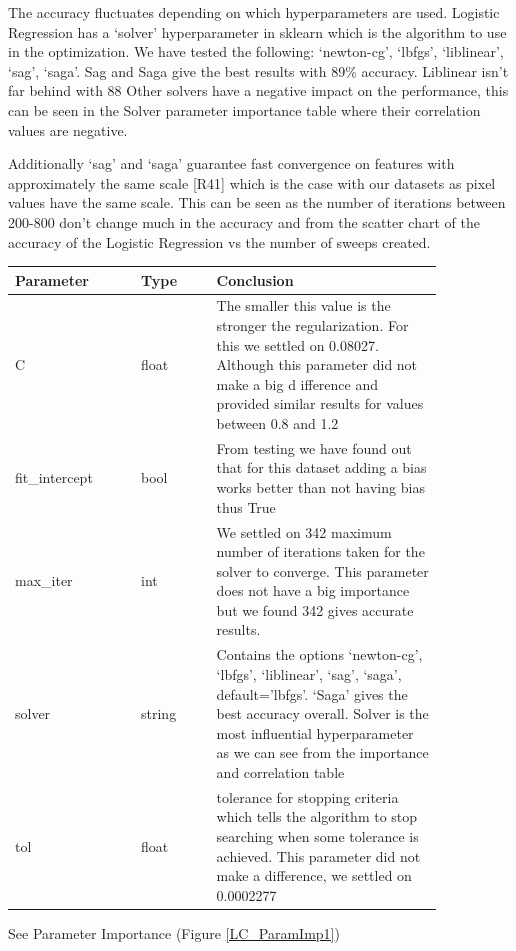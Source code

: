 \documentclass[11pt]{article}
\begin{document}
The accuracy fluctuates depending on which hyperparameters are used. Logistic Regression has a ‘solver’ hyperparameter in sklearn which is the algorithm to use in the optimization. We have tested the following: ‘newton-cg’, ‘lbfgs’, ‘liblinear’, ‘sag’, ‘saga’. Sag and Saga give the best results with 89\% accuracy. Liblinear isn't far behind with 88%
Other solvers have a negative impact on the performance, this can be seen in the Solver parameter importance table where their correlation values are negative.

Additionally ‘sag’ and ‘saga’ guarantee fast convergence on features with approximately the same scale [R41] which is the case with our datasets as pixel values have the same scale. This can be seen as the number of iterations between 200-800 don’t change much in the accuracy and from the scatter chart of the accuracy of the Logistic Regression vs the number of sweeps created.

\begin{table}[ht]
  \centering
  \begin{tabular}{|p{0.25\linewidth} | p{0.15 \linewidth} | p{0.45\linewidth}|} 
    \hline
    \textbf{Parameter} & \textbf{Type} & \textbf{Conclusion} \\ \hline
    C & float & The smaller this value is the stronger the regularization. For this we settled on 0.08027. Although this parameter did not make a big d ifference and provided similar results for values between 0.8 and 1.2 \\ \hline
    fit\_intercept & bool & From testing we have found out that for this dataset adding a bias works better than not having bias thus True  \\ \hline
    max\_iter & int &  We settled on 342 maximum number of iterations taken for the solver to converge. This parameter does not have a big importance but we found 342 gives accurate results. \\ \hline
    solver & string & Contains the options ‘newton-cg’, ‘lbfgs’, ‘liblinear’, ‘sag’, ‘saga’, default=’lbfgs’. ‘Saga’ gives the best accuracy overall. Solver is the most influential hyperparameter as we can see from the importance and correlation table \\ \hline
    tol & float & tolerance for stopping criteria which tells the algorithm to stop searching when some tolerance is achieved. This parameter did not make a difference, we settled on 0.0002277 \\ \hline


  \end{tabular}
\end{table}\label{LC_Analysis_Table}
See Parameter Importance (Figure \ref{LC_ParamImp1})
\end{document}
